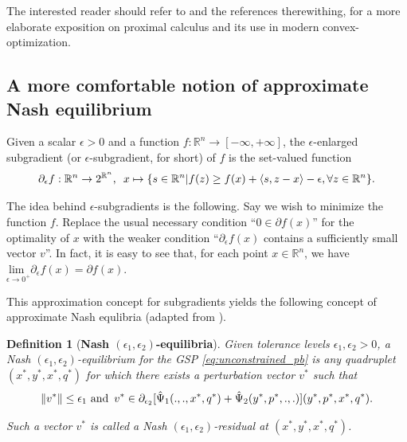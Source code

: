 \documentclass{article} %
\newtheorem{definition}[theorem]{Definition}
\begin{document}
The interested reader should refer to \cite{combettes2011proximal} and
the references therewithing, for a more elaborate exposition on
proximal calculus and its use in modern convex-optimization.

\subsection{A more comfortable notion of approximate Nash equilibrium}
Given a scalar $\epsilon > 0$ and a function $f:\mathbb{R}^n
\rightarrow [-\infty,+\infty]$, the $\epsilon$-enlarged subgradient (or
$\epsilon$-subgradient, for short) of $f$ is the set-valued function
\begin{eqnarray}
\partial_\epsilon f: \mathbb{R}^n \rightarrow
2^{\mathbb{R}^n}, \hspace{.5em} x \mapsto \{s \in \mathbb{R}^n | f(z)
\ge f(x) + \langle s, z - x\rangle - \epsilon,\forall z \in
\mathbb{R}^n\}.
\end{eqnarray}

The idea behind $\epsilon$-subgradients is the following. Say we wish
to minimize the function $f$. Replace the usual necessary
condition ``$0 \in \partial f(x)$'' for the optimality of $x$ with the
weaker condition ``$\partial_\epsilon f(x)$ contains a sufficiently
small vector $v$''. In fact, it is easy to see that, for each
point $x \in \mathbb{R}^n$, we have $\underset{\epsilon \rightarrow
  0^+}{\text{lim }}\partial_\epsilon f(x) = \partial f(x)$.

This approximation concept for subgradients yields the following
concept of approximate Nash equlibria (adapted from
\cite{he2013accelerating}).

\begin{definition}[\textbf{Nash $(\epsilon_1,\epsilon_2)$-equilibria}]
Given tolerance levels $\epsilon_1, \epsilon_2 > 0$, a Nash
$(\epsilon_1,\epsilon_2)$-equilibrium for the GSP \eqref{eq:unconstrained_pb}
is any quadruplet $(x^*, y^*, x^*, q^*)$ for which
there exists a perturbation vector $v^*$ such that
\begin{eqnarray}
\|v^*\| \le \epsilon_1 \text{ and}\hspace{.5em} v^* \in
\partial_{\epsilon_2}[\hat{\Psi}_1(., ., x^*, q^*) +
  \hat{\Psi}_2(y^*, p^*, ., .)](y^*,p^*,x^*,q^*).
\end{eqnarray}

Such a vector $v^*$ is called a Nash $(\epsilon_1, \epsilon_2)$-residual at $(x^*,
y^*, x^*, q^*)$.
\label{thm:cool_notion}
\end{definition}
\end{document}
